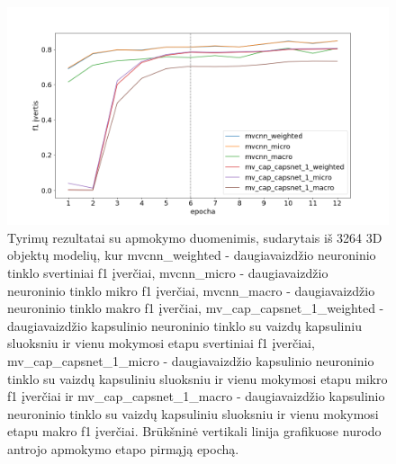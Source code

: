 \begin{figure}[H]
	\centering
	\includegraphics[scale=0.4]{img/3rd_sample_f1.png}
	\caption{
		Tyrimų rezultatai su apmokymo duomenimis, sudarytais iš 3264 3D objektų modelių, kur mvcnn\_weighted -  daugiavaizdžio neuroninio tinklo svertiniai f1 įverčiai, 
		mvcnn\_micro -  daugiavaizdžio neuroninio tinklo mikro f1 įverčiai, 
		mvcnn\_macro -  daugiavaizdžio neuroninio tinklo makro f1 įverčiai, 
		mv\_cap\_capsnet\_1\_weighted - daugiavaizdžio kapsulinio neuroninio tinklo su vaizdų kapsuliniu sluoksniu ir vienu mokymosi etapu svertiniai f1 įverčiai, 
		mv\_cap\_capsnet\_1\_micro - daugiavaizdžio kapsulinio neuroninio tinklo su vaizdų kapsuliniu sluoksniu ir vienu mokymosi etapu mikro f1 įverčiai ir
		mv\_cap\_capsnet\_1\_macro - daugiavaizdžio kapsulinio neuroninio tinklo su vaizdų kapsuliniu sluoksniu ir vienu mokymosi etapu makro f1 įverčiai. Brūkšninė vertikali linija grafikuose nurodo antrojo apmokymo etapo pirmąją epochą.
	}
	\label{img:3rd_sample_f1}
\end{figure}

